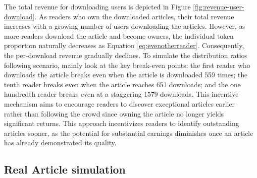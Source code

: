 \documentclass[lettersize,journal]{IEEEtran}
\begin{document}
The total revenue for downloading users is depicted in Figure \ref{fig:revenue-user-download}. As readers who own the downloaded articles, their total revenue increases with a growing number of users downloading the articles. However, as more readers download the article and become owners, the individual token proportion naturally decreases as Equation \ref{eq:evenotherreader}. Consequently, the per-download revenue gradually declines.
To simulate the distribution ratios following scenario, mainly look at the key break-even points\cite{norreklit2000balance}: the first reader who downloads the article breaks even when the article is downloaded 559 times; the tenth reader breaks even when the article reaches 651 downloads; and the one hundredth reader breaks even at a staggering 1579 downloads. This incentive mechanism aims to encourage readers to discover exceptional articles earlier rather than following the crowd since owning the article no longer yields significant returns.
This approach incentivizes readers to identify outstanding articles sooner, as the potential for substantial earnings diminishes once an article has already demonstrated its quality.


\subsection{Real Article simulation}
\end{document}
